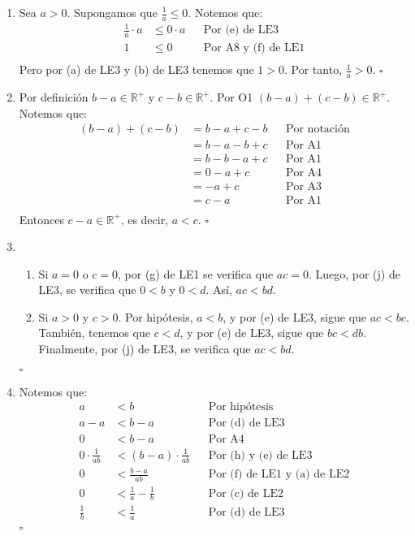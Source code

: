 \documentclass[11pt]{article}
\begin{document}
\begin{enumerate}[label=\alph*),font=\bfseries]

    \item Sea $a>0$. Supongamos que $\frac{1}{a} \leq 0$. Notemos que:
    \begin{align*}
        \frac{1}{a} \cdot a &\leq 0 \cdot a && \text{Por (e) de LE3}\\
        1 &\leq 0 && \text{Por A8 y (f) de LE1}\\
    \end{align*}
    Pero por (a) de LE3 y (b) de LE3 tenemos que $1>0$. Por tanto, $\frac{1}{a} > 0$.
    \mbox{}\hfill $\square$


    \item Por definición $b-a \in \mathbb{R}^+$ y $c-b \in \mathbb{R}^+$. Por O1 $(b-a) + (c-b) \in \mathbb{R}^+$. Notemos que:
    \begin{align*}
        (b-a) + (c-b) &= b - a + c -b && \text{Por notación}\\
        &= b-a -b+c && \text{Por A1}\\
        &= b-b -a+c && \text{Por A1}\\
        &= 0 - a +c && \text{Por A4}\\
        &= -a +c && \text{Por A3}\\
        &= c-a && \text{Por A1}\\
    \end{align*}
    Entonces $c-a \in \mathbb{R}^+$, es decir, $a<c$.
    \mbox{}\hfill $\square$


    \item 
    \begin{enumerate}[label=\roman*),font=\bfseries]
        \item Si $a=0$ o $c=0$, por (g) de LE1 se verifica que $ac=0$. Luego, por (j) de LE3, se verifica que $0<b$ y $0<d$. Así, $ac<bd$.
        \item Si $a>0$ y $c>0$. Por hipótesis, $a<b$, y por (e) de LE3, sigue que $ac<bc$. También, tenemos que $c<d$, y por (e) de LE3, sigue que $bc<db$. Finalmente, por (j) de LE3, se verifica que $ac<bd$.
    \end{enumerate}
    \mbox{}\hfill $\square$


    \item Notemos que:
    \begin{align*}
    a &< b && \text{Por hipótesis} \\
    a-a &< b-a && \text{Por (d) de LE3} \\
    0 &< b-a && \text{Por A4} \\
    0 \cdot \frac{1}{ab} &< (b-a) \cdot \frac{1}{ab} && \text{Por (h) y (e) de LE3}\\
    0 &< \frac{b-a}{ab} && \text{Por (f) de LE1 y (a) de LE2}\\
    0 &< \frac{1}{a} - \frac{1}{b} && \text{Por (c) de LE2}\\
    \frac{1}{b} &< \frac{1}{a} && \text{Por (d) de LE3}\\
    \end{align*}
    \mbox{}\hfill $\square$


\end{enumerate}
\end{document}
